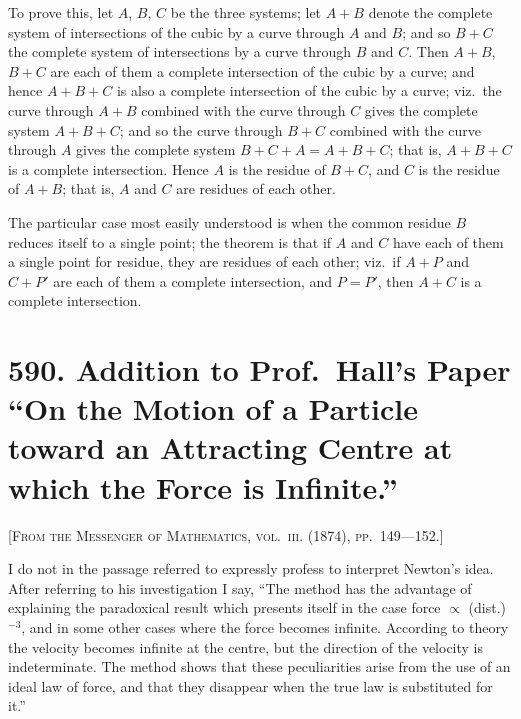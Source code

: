 \documentclass[11pt,a4paper]{article}
\theoremstyle{plain}
\theoremstyle{definition}
\theoremstyle{remark}
\begin{document}
To prove this, let $A$, $B$, $C$ be the three systems; let $A + B$ denote the complete system of intersections of the cubic by a curve through $A$ and $B$; and so $B + C$ the complete system of intersections by a curve through $B$ and $C$. Then $A + B$, $B + C$ are each of them a complete intersection of the cubic by a curve; and hence $A + B + C$ is also a complete intersection of the cubic by a curve; viz.\ the curve through $A + B$ combined with the curve through $C$ gives the complete system $A + B + C$; and so the curve through $B + C$ combined with the curve through $A$ gives the complete system $B + C + A = A + B + C$; that is, $A + B + C$ is a complete intersection. Hence $A$ is the residue of $B + C$, and $C$ is the residue of $A + B$; that is, $A$ and $C$ are residues of each other.

The particular case most easily understood is when the common residue $B$ reduces itself to a single point; the theorem is that if $A$ and $C$ have each of them a single point for residue, they are residues of each other; viz.\ if $A + P$ and $C + P'$ are each of them a complete intersection, and $P = P'$, then $A + C$ is a complete intersection.

\newpage

\section*{590. Addition to Prof.\ Hall's Paper ``On the Motion of a Particle toward an Attracting Centre at which the Force is Infinite.''}

\noindent\textsc{[From the Messenger of Mathematics, vol.~\textsc{iii}. (1874), pp.~149---152.]}

\medskip

\noindent I do not in the passage referred to expressly profess to interpret Newton's idea. After referring to his investigation I say, ``The method has the advantage of explaining the paradoxical result which presents itself in the case force $\propto$ (dist.)$^{-3}$, and in some other cases where the force becomes infinite. According to theory the velocity becomes infinite at the centre, but the direction of the velocity is indeterminate. The method shows that these peculiarities arise from the use of an ideal law of force, and that they disappear when the true law is substituted for it.''
\end{document}
